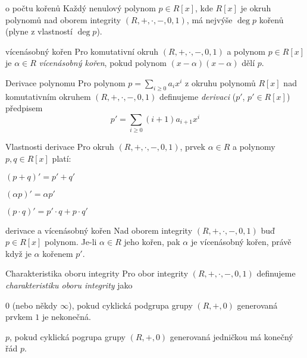 \begin{vetaN}{o počtu kořenů}
Každý nenulový polynom $p\in R[x]$, kde $R[x]$ je okruh polynomů nad oborem integrity $(R,+,\cdot,-,0,1)$, má nejvýše $\deg p$ kořenů (plyne z vlastností $\deg p$).
\end{vetaN}

\begin{definiceN}{vícenásobný kořen}
Pro komutativní okruh $(R,+,\cdot,-,0,1)$ a polynom $p\in R[x]$ je $\alpha\in R$ \emph{vícenásobný kořen}, pokud polynom $(x-\alpha)(x-\alpha)$ dělí $p$.
\end{definiceN}

\begin{definiceN}{Derivace polynomu}
Pro polynom $p=\sum_{i\geq 0}a_i x^i$ z okruhu polynomů $R[x]$ nad komutativním okruhem $(R,+,\cdot,-,0,1)$ definujeme \emph{derivaci} ($p'$, $p'\in R[x]$) předpisem $$p'=\sum_{i\geq 0}(i+1)a_{i+1}x^i$$
\end{definiceN}

\begin{poznamkaN}{Vlastnosti derivace}
Pro okruh $(R,+,\cdot,-,0,1)$, prvek $\alpha\in R$ a polynomy $p,q\in R[x]$ platí:
\begin{pitemize}
    \item $(p+q)'=p'+q'$
    \item $(\alpha p)'=\alpha p'$
    \item $(p\cdot q)' = p'\cdot q + p\cdot q'$
\end{pitemize}
\end{poznamkaN}

\begin{vetaN}{derivace a vícenásobný kořen}
Nad oborem integrity $(R,+,\cdot,-,0,1)$ buď $p\in R[x]$ polynom. Je-li $\alpha\in R$ jeho kořen, pak $\alpha$ je vícenásobný kořen, právě když je $\alpha$ kořenem $p'$.
\end{vetaN}

\begin{definiceN}{Charakteristika oboru integrity}
Pro obor integrity $(R,+,\cdot,-,0,1)$ definujeme \emph{charakteristiku oboru integrity} jako
\begin{pitemize}
    \item $0$ (nebo někdy $\infty$), pokud cyklická podgrupa grupy $(R,+,0)$ generovaná prvkem $1$ je nekonečná.
    \item $p$, pokud cyklická pogrupa grupy $(R,+,0)$ generovaná jedničkou má konečný řád $p$.
\end{pitemize}
\end{definiceN}

